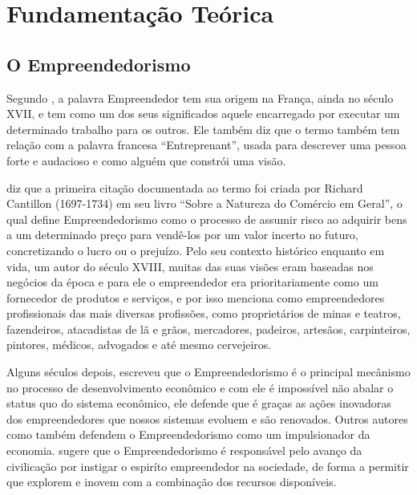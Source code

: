 \chapter[Fundamentação Teórica]{Fundamentação Teórica}
\label{cap-fundamentacao_teorica}

\section{O Empreendedorismo}
\label{section:o_empreendedorismo}

Segundo , a palavra Empreendedor tem sua origem na França, ainda no século XVII, e tem como um dos seus significados aquele encarregado por executar um determinado trabalho para os outros. Ele também diz que o termo também tem relação com a palavra francesa ``Entreprenant'', usada para descrever uma pessoa forte e audacioso e como alguém que constrói uma visão.

 diz que a primeira citação documentada ao termo foi criada por Richard Cantillon (1697-1734) em seu livro ``Sobre a Natureza do Comércio em Geral'', o qual define Empreendedorismo como o processo de assumir risco ao adquirir bens a um determinado preço para vendê-los por um valor incerto no futuro, concretizando o lucro ou o prejuízo. Pelo seu contexto histórico enquanto em vida, um autor do século XVIII, muitas das suas visões eram baseadas nos negócios da época e para ele o empreendedor era prioritariamente como um fornecedor de produtos e serviços, e por isso menciona como empreendedores profissionais das mais diversas profissões, como proprietários de minas e teatros, fazendeiros, atacadistas de lã e grãos, mercadores, padeiros, artesãos, carpinteiros, pintores, médicos, advogados e até mesmo cervejeiros. 

Alguns séculos depois,  escreveu que o Empreendedorismo é o principal mecânismo no processo de desenvolvimento econômico e com ele é impossível não abalar o status quo do sistema econômico, ele defende que é graças as ações inovadoras dos empreendedores que nossos sistemas evoluem e são renovados. Outros autores como  também defendem o Empreendedorismo como um impulsionador da economia.  sugere que o Empreendedorismo é responsável pelo avanço da civilicação por instigar o espiríto empreendedor na sociedade, de forma a permitir que explorem e inovem com a combinação dos recursos disponíveis.

